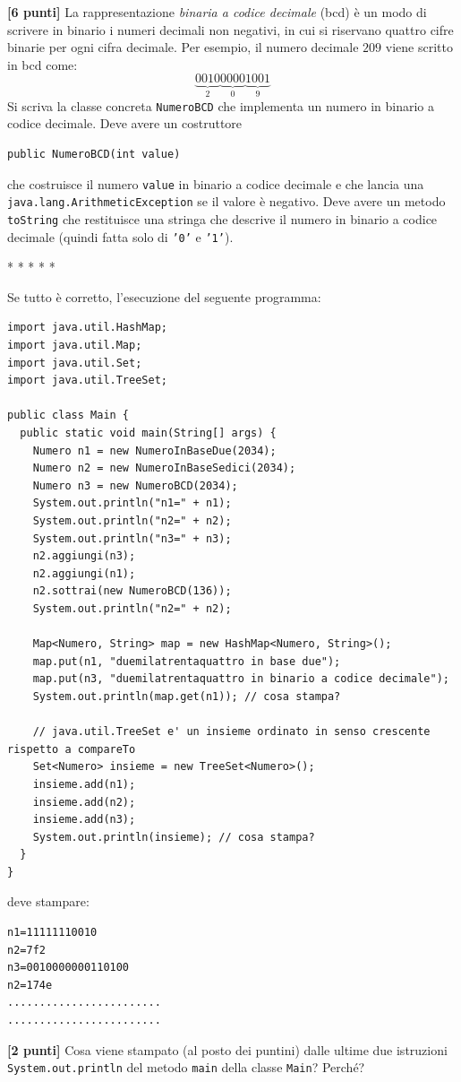 \documentclass{article}[10pt]
\newcounter{esnu}
\newenvironment{esercizio}{\medskip \noindent {\bf Esercizio\addtocounter{esnu}{1} \arabic{esnu}}}{}
\begin{document}
\begin{esercizio}
\textbf{[6 punti]}
La rappresentazione \emph{binaria a codice decimale} (bcd) \`e un modo di scrivere in
binario i numeri decimali non negativi, in cui si riservano quattro cifre binarie per ogni cifra
decimale. Per esempio, il numero decimale $209$ viene scritto in bcd come:
\[
  \underbrace{0010}_2\underbrace{0000}_0\underbrace{1001}_9
\]
Si scriva la classe concreta \texttt{NumeroBCD} che implementa un numero in
binario a codice decimale. Deve avere un costruttore
{\small
\begin{verbatim}
public NumeroBCD(int value)
\end{verbatim}
}

\noindent
che costruisce il numero \texttt{value} in binario a codice decimale e che lancia una
\texttt{java.lang.ArithmeticException} se il valore \`e negativo.
Deve avere un metodo \texttt{toString} che restituisce una stringa che descrive
il numero in binario a codice decimale (quindi fatta solo di \texttt{'0'} e \texttt{'1'}).
\end{esercizio}

\begin{center}
* * * * *
\end{center}

Se tutto \`e corretto, l'esecuzione del seguente programma:
%
{\small
\begin{verbatim}
import java.util.HashMap;
import java.util.Map;
import java.util.Set;
import java.util.TreeSet;

public class Main {
  public static void main(String[] args) {
    Numero n1 = new NumeroInBaseDue(2034);
    Numero n2 = new NumeroInBaseSedici(2034);
    Numero n3 = new NumeroBCD(2034);
    System.out.println("n1=" + n1);
    System.out.println("n2=" + n2);
    System.out.println("n3=" + n3);
    n2.aggiungi(n3);
    n2.aggiungi(n1);
    n2.sottrai(new NumeroBCD(136));
    System.out.println("n2=" + n2);

    Map<Numero, String> map = new HashMap<Numero, String>();
    map.put(n1, "duemilatrentaquattro in base due");
    map.put(n3, "duemilatrentaquattro in binario a codice decimale");
    System.out.println(map.get(n1)); // cosa stampa?

    // java.util.TreeSet e' un insieme ordinato in senso crescente rispetto a compareTo
    Set<Numero> insieme = new TreeSet<Numero>();
    insieme.add(n1);
    insieme.add(n2);
    insieme.add(n3); 
    System.out.println(insieme); // cosa stampa?
  }
}
\end{verbatim}
}

\noindent
deve stampare:
%
{\small
\begin{verbatim}
n1=11111110010
n2=7f2
n3=0010000000110100
n2=174e
........................
........................
\end{verbatim}
}

\begin{esercizio}
\textbf{[2 punti]}
Cosa viene stampato (al posto dei puntini) dalle ultime due istruzioni
\texttt{System.out.println} del metodo \texttt{main} della classe \texttt{Main}?
Perch\'e?
\end{esercizio}
\end{document}
